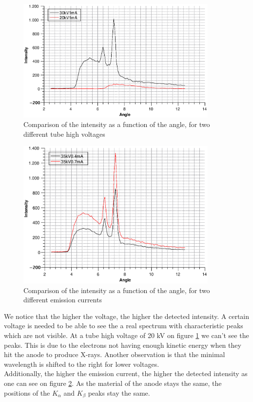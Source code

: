 \documentclass{scrartcl}
\begin{document}
\begin{figure}[!ht]
    \centering
    \includegraphics[width=10cm]{Influence_20_30.eps}
    \caption{Comparison of the intensity as a function of the angle, for two different tube high voltages}
    \label{fig:20_30}
\end{figure}
\FloatBarrier

\begin{figure}[!ht]
    \centering
    \includegraphics[width=10cm]{Inflience_35.eps}
    \caption{Comparison of the intensity as a function of the angle, for two different emission currents}
    \label{fig:35}
\end{figure}
\FloatBarrier

\noindent We notice that the higher the voltage, the higher the detected intensity. A certain voltage is needed to be able to see the a real spectrum with characteristic peaks which are not visible. At a tube high voltage of 20 kV on figure \ref{fig:20_30} we can't see the peaks. This is due to the electrons not having enough kinetic energy when they hit the anode to produce X-rays. Another observation is that the minimal wavelength is shifted to the right for lower voltages. \\ Additionally, the higher the emission current, the higher the detected intensity as one can see on figure \ref{fig:35}. As the material of the anode stays the same, the positions of the $K_{\alpha}$ and $K_{\beta}$ peaks stay the same. \\
\end{document}
